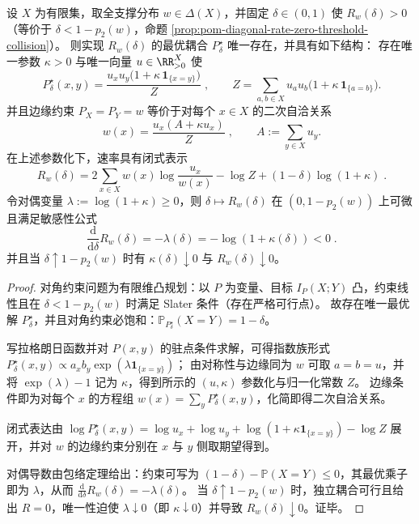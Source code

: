 \begin{theorem}[速率函数的显式参数化与对偶导数]\label{thm:pom-diagonal-rate-explicit-param-and-derivative}
设 \(X\) 为有限集，取全支撑分布 \(w\in\Delta(X)\)，并固定 \(\delta\in(0,1)\) 使 \(R_w(\delta)>0\)（等价于 \(\delta<1-p_2(w)\)，命题 \ref{prop:pom-diagonal-rate-zero-threshold-collision}）。
则实现 \(R_w(\delta)\) 的最优耦合 \(P^\star_\delta\) 唯一存在，并具有如下结构：
存在唯一参数 \(\kappa>0\) 与唯一向量 \(u\in\RR_{>0}^X\) 使
\[
\boxed{\;
P^\star_\delta(x,y)=\frac{u_xu_y\bigl(1+\kappa\,\mathbf 1_{\{x=y\}}\bigr)}{Z}\;},
\qquad
Z=\sum_{a,b\in X}u_au_b\bigl(1+\kappa\,\mathbf 1_{\{a=b\}}\bigr).
\]
并且边缘约束 \(P_X=P_Y=w\) 等价于对每个 \(x\in X\) 的二次自洽关系
\[
\boxed{\;
w(x)=\frac{u_x(A+\kappa u_x)}{Z}\;},
\qquad
A:=\sum_{y\in X}u_y.
\]
在上述参数化下，速率具有闭式表示
\[
\boxed{\;
R_w(\delta)
=2\sum_{x\in X}w(x)\log\frac{u_x}{w(x)}
-\log Z+(1-\delta)\log(1+\kappa)\; } .
\]
令对偶变量 \(\lambda:=\log(1+\kappa)\ge 0\)，则 \(\delta\mapsto R_w(\delta)\) 在 \((0,1-p_2(w))\) 上可微且满足敏感性公式
\[
\boxed{\;
\frac{\mathrm d}{\mathrm d\delta}R_w(\delta)=-\lambda(\delta)=-\log(1+\kappa(\delta))<0\; } .
\]
并且当 \(\delta\uparrow 1-p_2(w)\) 时有 \(\kappa(\delta)\downarrow 0\) 与 \(R_w(\delta)\downarrow 0\)。
\end{theorem}
\begin{proof}
对角约束问题为有限维凸规划：以 \(P\) 为变量、目标 \(I_P(X;Y)\) 凸，约束线性且在 \(\delta<1-p_2(w)\) 时满足 Slater 条件（存在严格可行点）。
故存在唯一最优解 \(P^\star_\delta\)，并且对角约束必饱和：\(\mathbb{P}_{P^\star_\delta}(X=Y)=1-\delta\)。
\par
写拉格朗日函数并对 \(P(x,y)\) 的驻点条件求解，可得指数族形式
\(
P^\star_\delta(x,y)\propto a_x b_y\exp(\lambda\mathbf 1_{\{x=y\}})
\)；
由对称性与边缘同为 \(w\) 可取 \(a=b=u\)，并将 \(\exp(\lambda)-1\) 记为 \(\kappa\)，得到所示的 \((u,\kappa)\) 参数化与归一化常数 \(Z\)。
边缘条件即为对每个 \(x\) 的方程组 \(w(x)=\sum_y P^\star_\delta(x,y)\)，化简即得二次自洽关系。
\par
闭式表达由
\(
\log P^\star_\delta(x,y)=\log u_x+\log u_y+\log(1+\kappa\mathbf 1_{\{x=y\}})-\log Z
\)
展开，并对 \(w\) 的边缘约束分别在 \(x\) 与 \(y\) 侧取期望得到。
\par
对偶导数由包络定理给出：约束可写为 \((1-\delta)-\mathbb{P}(X=Y)\le 0\)，其最优乘子即为 \(\lambda\)，从而 \(\frac{\mathrm d}{\mathrm d\delta}R_w(\delta)=-\lambda(\delta)\)。
当 \(\delta\uparrow 1-p_2(w)\) 时，独立耦合可行且给出 \(R=0\)，唯一性迫使 \(\lambda\downarrow 0\)（即 \(\kappa\downarrow 0\)）并导致 \(R_w(\delta)\downarrow 0\)。证毕。
\end{proof}

